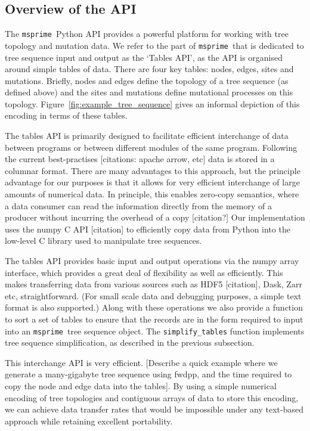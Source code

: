 \documentclass{article}
\newcommand{\msprime}{\texttt{msprime}}
\begin{document}
\subsection*{Overview of the API}

The \msprime\ Python API provides a powerful platform for working with
tree topology and mutation data. We refer to the part of \msprime\
that is dedicated to tree sequence input and output as the `Tables API',
as the API is organised around simple tables of data. There are four key
tables: nodes, edges, sites and mutations. Briefly, nodes and edges define
the topology of a tree sequence (as defined above) and the sites and mutations
define mutational processes on this topology.
Figure~\ref{fig:example_tree_sequence} gives an informal depiction of this
encoding in terms of these tables.

The tables API is primarily designed to facilitate efficient interchange of
data between programs or between different modules of the same program.
Following the current best-practises [citations: apache arrow, etc] data is stored
in a columnar format. There are many advantages to this approach, but the
principle advantage for our purposes is that it allows for very efficient
interchange of large amounts of numerical data. In principle, this enables
zero-copy semantics, where a data consumer can read the information directly
from the memory of a producer without incurring the overhead of a copy
[citation?] Our implementation uses the numpy C API [citation] to efficiently copy
data from Python into the low-level C library used to manipulate
tree sequences.

The tables API provides basic input and output operations via the numpy
array interface, which provides a great deal of flexibility as well
as efficiently. This makes transferring data from various sources
such as HDF5 [citation], Dask, Zarr etc, straightforward. (For small
scale data and debugging purposes, a simple text format is also supported.)
Along with
these operations we also provide a function to sort a set of tables
to ensure that the records are in the form required to input
into an \msprime\ tree sequence object. The \texttt{simplify\_tables}
function implements tree sequence simplification, as described in the
previous subsection.

This interchange API is very efficient. [Describe a quick example where we generate
a many-gigabyte tree sequence using fwdpp, and the time required
to copy the node and edge data into the tables]. By using a simple numerical
encoding of tree topologies and contiguous arrays of data to store this
encoding, we can achieve data transfer rates that would be impossible under
any text-based approach while retaining excellent portability.
\end{document}
